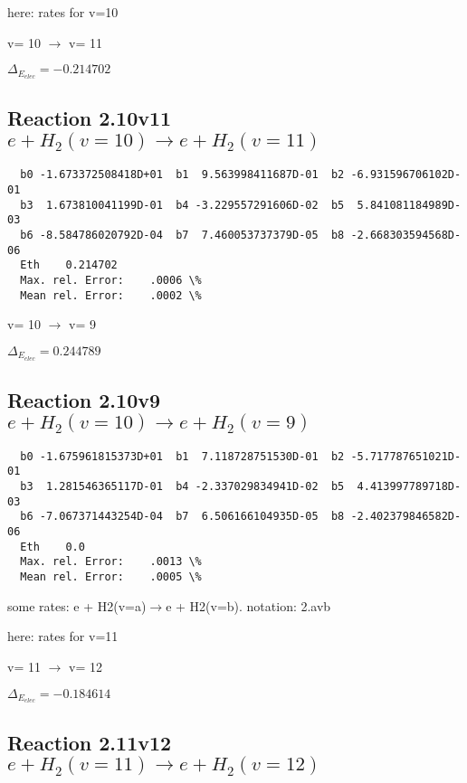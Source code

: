 \documentclass[12pt,dvipdfmx]{article}
\begin{document}
here: rates for v=10


  v=  10 $\rightarrow$ v= 11

$\Delta_{E_{elec}}=-0.214702$


\subsection{
Reaction 2.10v11
$ e + H_2(v=10) \rightarrow e + H_2(v=11) $
}


\begin{small}\begin{verbatim}
  b0 -1.673372508418D+01  b1  9.563998411687D-01  b2 -6.931596706102D-01
  b3  1.673810041199D-01  b4 -3.229557291606D-02  b5  5.841081184989D-03
  b6 -8.584786020792D-04  b7  7.460053737379D-05  b8 -2.668303594568D-06
  Eth    0.214702
  Max. rel. Error:    .0006 \%
  Mean rel. Error:    .0002 \%

\end{verbatim}\end{small}

  v=  10 $\rightarrow$ v= 9

$\Delta_{E_{elec}}= 0.244789$


\subsection{
Reaction 2.10v9
$ e + H_2(v=10) \rightarrow e + H_2(v=9) $
}


\begin{small}\begin{verbatim}
  b0 -1.675961815373D+01  b1  7.118728751530D-01  b2 -5.717787651021D-01
  b3  1.281546365117D-01  b4 -2.337029834941D-02  b5  4.413997789718D-03
  b6 -7.067371443254D-04  b7  6.506166104935D-05  b8 -2.402379846582D-06
  Eth    0.0
  Max. rel. Error:    .0013 \%
  Mean rel. Error:    .0005 \%

\end{verbatim}\end{small}
\newpage
some rates: e + H2(v=a)$\rightarrow$e + H2(v=b). notation: 2.avb

here: rates for v=11



  v=  11 $\rightarrow$ v= 12

$\Delta_{E_{elec}}=-0.184614$


\subsection{
Reaction 2.11v12
$ e + H_2(v=11) \rightarrow e + H_2(v=12) $
}
\end{document}
